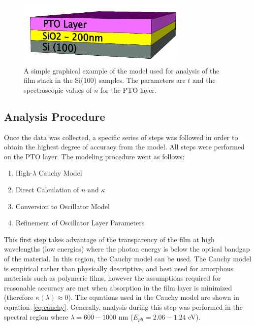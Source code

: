 \begin{figure}[tb]
   \centering
   \includegraphics[width=0.75\textwidth]{./figures/DataAnalysis/ellipsometry-model-Si}
   \caption[Graphical Schematic of VASE Model]{A simple graphical example of the model used for %
   					analysis of the film stack in the Si(100) samples. The parameters %
					are $t$ and the spectroscopic values of $\tilde{n}$ for the PTO layer.}
   \label{fig:Si(100)-model}
\end{figure}


\subsection{Analysis Procedure}
\label{chap:Methods-Ellip-Analysis}

Once the data was collected, a specific series of steps was followed in order to obtain the highest degree of accuracy from the model. All steps were performed on the PTO layer. The modeling procedure went as follows:

\begin{enumerate}
\item
High-$\lambda$ Cauchy Model
\item
Direct Calculation of $n$ and $\kappa$
\item
Conversion to Oscillator Model
\item
Refinement of Oscillator Layer Parameters
\end{enumerate}

This first step takes advantage of the transparency of the film at high wavelengths (low energies) where the photon energy is below the optical bandgap of the material. In this region, the Cauchy model can be used. The Cauchy model is empirical rather than physically descriptive, and best used for amorphous materials such as polymeric films, however the assumptions required for reasonable accuracy are met when absorption in the film layer is minimized (therefore $\kappa(\lambda)\approx0$). The equations used in the Cauchy model are shown in equation~\vref{eq:cauchy}. Generally, analysis during this step was performed in the spectral region where $\lambda = 600-1000$ nm ($E_{ph} = 2.06-1.24$ eV). 

